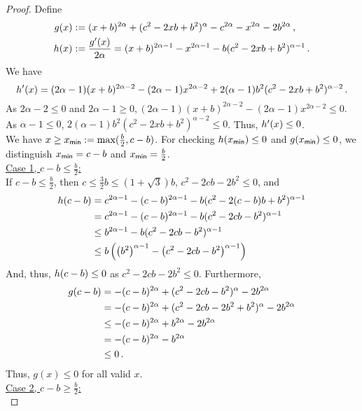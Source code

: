 %
\begin{proof}
	Define
	\begin{align*}
		g(x) &:=(x+b)^{2\alpha}+(c^2 - 2 x b + b^2)^\alpha - c^{2\alpha}-x^{2\alpha} - 2 b^{2\alpha} \, ,
		\\
		h(x) &:= \frac{g^\prime(x)}{2\alpha}
		=
		(x+b)^{2\alpha-1}-x^{2\alpha-1}-b(c^2 - 2 x b + b^2)^{\alpha -1}
		\, .
	\end{align*}
	We have
	\begin{equation*}
		h^\prime(x)
		=
		(2\alpha-1)(x+b)^{2\alpha-2}-(2\alpha-1)x^{2\alpha-2}+2(\alpha -1) b^2(c^2 - 2 x b + b^2)^{\alpha -2}
		\, .
	\end{equation*}
	As $2\alpha-2 \leq 0$ and $2\alpha-1 \geq 0, (2\alpha-1)(x+b)^{2\alpha-2}-(2\alpha-1)x^{2\alpha-2}\leq 0$.
	As $\alpha-1\leq0$, $2(\alpha -1) b^2(c^2 - 2 x b + b^2)^{\alpha -2} \leq 0$.
	Thus, $h^\prime(x)\leq0$. \\
	We have $x\geq x_{\mathsf{min}} := \max(\frac b2, c-b)$. For checking $h(x_{\mathsf{min}}) \leq 0$ and $g(x_{\mathsf{min}}) \leq 0$, we distinguish $x_{\mathsf{min}} = c-b$ and $x_{\mathsf{min}} = \frac b2$.\\
	\underline{Case 1, $c-b\leq\frac b2$:}\\
	If $c-b\leq\frac b2$, then $c\leq \frac32 b \leq (1+\sqrt{3})b$, $c^2 -2cb-2b^2\leq0$, and
	\begin{align*}
		h\!\left( c-b \right) 
		&= 
		c^{2\alpha-1}-(c-b)^{2\alpha-1}-b(c^2 - 2 (c-b) b + b^2)^{\alpha -1}
		\\&= 
		c^{2\alpha-1}-(c-b)^{2\alpha-1}-b(c^2 - 2 c b - b^2)^{\alpha -1}
		\\&\leq 
		b^{2\alpha-1}-b(c^2 - 2 c b - b^2)^{\alpha -1}
		\\&\leq 
		b \left( \left( b^2 \right)^{\alpha-1}-\left( c^2 - 2 c b - b^2 \right)^{\alpha -1} \right)
	\end{align*}
	And, thus, $h\!\left( c-b \right)  \leq 0$ as $c^2 -2cb-2b^2\leq0$.
	Furthermore,
	\begin{align*}
		g\!\left( c-b \right) 
		&=
		-(c-b)^{2\alpha}+(c^2 - 2 c b-b^2)^\alpha 
		- 2 b^{2\alpha} 
		\\&=
		-(c-b)^{2\alpha}+(c^2 - 2 c b-2b^2+b^2)^\alpha 
				- 2 b^{2\alpha} 
		\\&\leq 
		-(c-b)^{2\alpha}+b^{2\alpha }
		- 2 b^{2\alpha} 
		\\&=
		-(c-b)^{2\alpha}
		- b^{2\alpha} 
		\\&\leq
		0
		\, .
	\end{align*}
	Thus, $g(x)\leq 0$ for all valid $x$.\\
	\underline{Case 2, $c-b\geq\frac b2$:}\\

\end{proof}
